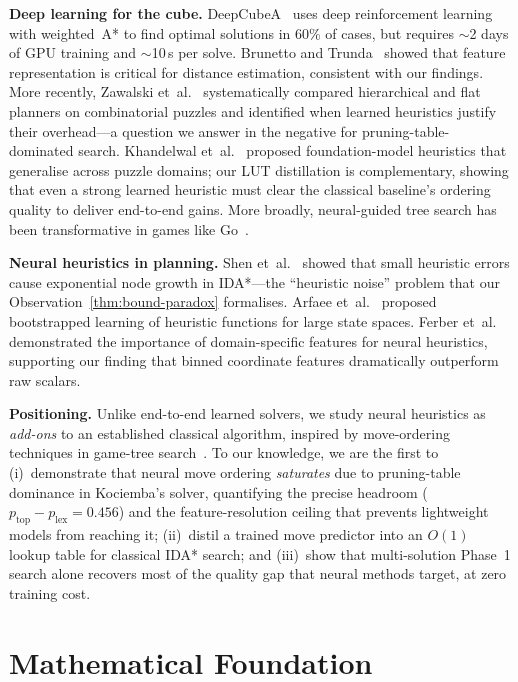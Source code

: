 \documentclass[graybox]{svmult}
\begin{document}
\textbf{Deep learning for the cube.}
DeepCubeA~\cite{deepcubea} uses deep reinforcement learning with weighted~A* to find optimal solutions in 60\% of cases, but requires $\sim$2 days of GPU training and $\sim$10\,s per solve. Brunetto and Trunda~\cite{brunetto2017} showed that feature representation is critical for distance estimation, consistent with our findings. More recently, Zawalski et~al.~\cite{zawalski2024} systematically compared hierarchical and flat planners on combinatorial puzzles and identified when learned heuristics justify their overhead---a question we answer in the negative for pruning-table-dominated search. Khandelwal et~al.~\cite{khandelwal2024} proposed foundation-model heuristics that generalise across puzzle domains; our LUT distillation is complementary, showing that even a strong learned heuristic must clear the classical baseline's ordering quality to deliver end-to-end gains. More broadly, neural-guided tree search has been transformative in games like Go~\cite{silver2016, silver2017}.

\textbf{Neural heuristics in planning.}
Shen et~al.~\cite{shen2020} showed that small heuristic errors cause exponential node growth in IDA*---the ``heuristic noise'' problem that our Observation~\ref{thm:bound-paradox} formalises. Arfaee et~al.~\cite{arfaee2011} proposed bootstrapped learning of heuristic functions for large state spaces. Ferber et~al.~\cite{ferber2022} demonstrated the importance of domain-specific features for neural heuristics, supporting our finding that binned coordinate features dramatically outperform raw scalars.

\textbf{Positioning.}
Unlike end-to-end learned solvers, we study neural heuristics as \emph{add-ons} to an established classical algorithm, inspired by move-ordering techniques in game-tree search~\cite{schaeffer1989, reinefeld1994}. To our knowledge, we are the first to (i)~demonstrate that neural move ordering \emph{saturates} due to pruning-table dominance in Kociemba's solver, quantifying the precise headroom ($p_{\text{top}} - p_{\text{lex}} = 0.456$) and the feature-resolution ceiling that prevents lightweight models from reaching it; (ii)~distil a trained move predictor into an $O(1)$ lookup table for classical IDA* search; and (iii)~show that multi-solution Phase~1 search alone recovers most of the quality gap that neural methods target, at zero training cost.

\section{Mathematical Foundation}
\label{sec:math}
\end{document}
